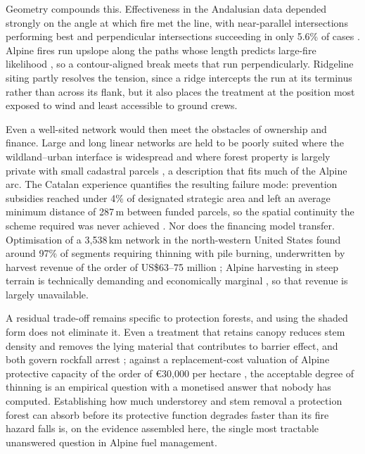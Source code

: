 \documentclass[11pt,a4paper]{article}
\begin{document}
Geometry compounds this. Effectiveness in the Andalusian data depended strongly on the angle at which fire met the line, with near-parallel intersections performing best and perpendicular intersections succeeding in only 5.6\% of cases \citep{ortega_modeling_2024}. Alpine fires run upslope along the paths whose length predicts large-fire likelihood \citep{conedera_linking_2024}, so a contour-aligned break meets that run perpendicularly. Ridgeline siting \citep{ascoli_firebreak_2018} partly resolves the tension, since a ridge intercepts the run at its terminus rather than across its flank, but it also places the treatment at the position most exposed to wind and least accessible to ground crews.

Even a well-sited network would then meet the obstacles of ownership and finance. Large and long linear networks are held to be poorly suited where the wildland--urban interface is widespread and where forest property is largely private with small cadastral parcels \citep{ascoli_firebreak_2018}, a description that fits much of the Alpine arc. The Catalan experience quantifies the resulting failure mode: prevention subsidies reached under 4\% of designated strategic area and left an average minimum distance of 287\,m between funded parcels, so the spatial continuity the scheme required was never achieved \citep{gorrizmifsud_current_2026}. Nor does the financing model transfer. Optimisation of a 3{,}538\,km network in the north-western United States found around 97\% of segments requiring thinning with pile burning, underwritten by harvest revenue of the order of US\$63--75 million \citep{ager_optimizing_2023}; Alpine harvesting in steep terrain is technically demanding and economically marginal \citep{dinca_timber_2025}, so that revenue is largely unavailable.

A residual trade-off remains specific to protection forests, and using the shaded form does not eliminate it. Even a treatment that retains canopy reduces stem density and removes the lying material that contributes to barrier effect, and both govern rockfall arrest \citep{costa_biological_2021, moos_climate_2021}; against a replacement-cost valuation of Alpine protective capacity of the order of €30{,}000 per hectare \citep{accastello_asforesee_2019}, the acceptable degree of thinning is an empirical question with a monetised answer that nobody has computed. Establishing how much understorey and stem removal a protection forest can absorb before its protective function degrades faster than its fire hazard falls is, on the evidence assembled here, the single most tractable unanswered question in Alpine fuel management.
\end{document}
